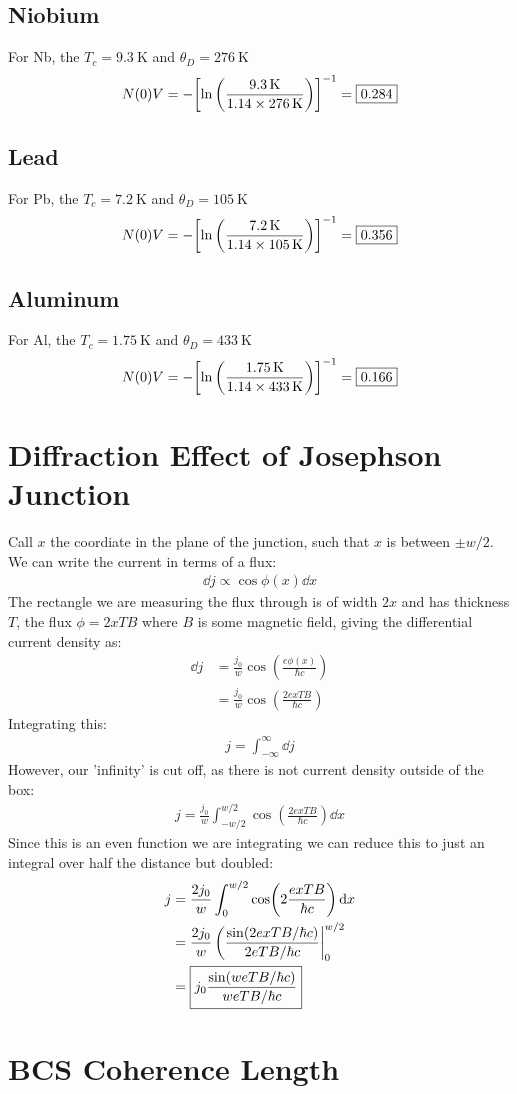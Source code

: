 \documentclass[12pt]{article}
\begin{document}
\subsection{Niobium}
For Nb, the $T_c=\SI{9.3}{\K}$ and $\theta_D=\SI{276}{\K}$
\begin{align*}
  N(0)V=-\qty[\ln\qty(\frac{\SI{9.3}{\K}}{1.14\times\SI{276}{\K}})]^{-1}
  =\boxed{0.284}
\end{align*}
\subsection{Lead}
For Pb, the $T_c=\SI{7.2}{\K}$ and $\theta_D=\SI{105}{\K}$
\begin{align*}
  N(0)V=-\qty[\ln\qty(\frac{\SI{7.2}{\K}}{1.14\times\SI{105}{\K}})]^{-1}
  =\boxed{0.356}
\end{align*}
\subsection{Aluminum}
For Al, the $T_c=\SI{1.75}{\K}$ and $\theta_D=\SI{433}{\K}$
\begin{align*}
  N(0)V=-\qty[\ln\qty(\frac{\SI{1.75}{\K}}{1.14\times\SI{433}{\K}})]^{-1}
  =\boxed{0.166}
\end{align*}
\newpage\section{Diffraction Effect of Josephson Junction}
Call $x$ the coordiate in the plane of the junction, such that $x$ is between $\pm w/2$. We can write the current in terms of a flux:
\begin{align*}
  \dd{j}\propto\cos\phi(x)\dd{x}
\end{align*}
The rectangle we are measuring the flux through is of width $2x$ and has thickness $T$, the flux $\phi=2xT B$ where $B$ is some magnetic field, giving the differential current density as:
\begin{align*}
  \dd{j}&=\frac{j_0}{w}\cos(\frac{e\phi(x)}{\hbar c})\\
  &=\frac{j_0}{w}\cos(\frac{2exTB}{\hbar c})
\end{align*}
Integrating this:
\begin{align*}
  j=\int_{-\infty}^\infty\dd{j}
\end{align*}
However, our 'infinity' is cut off, as there is not current density outside of the box:
\begin{align*}
  j=\frac{j_0}{w}\int_{-w/2}^{w/2}\cos(\frac{2exTB}{\hbar c})\dd{x}
\end{align*}
Since this is an even function we are integrating we can reduce this to just an integral over half the distance but doubled:
\begin{align*}
  j&=\frac{2j_0}{w}\int_{0}^{w/2}\cos(2\frac{exTB}{\hbar c})\dd{x}\\
  &=\frac{2j_0}{w}\eval(\frac{\sin(2exTB/\hbar c)}{2eTB/\hbar c}|_0^{w/2}\\
  &=\boxed{j_0\frac{\sin(weTB/\hbar c)}{weTB/\hbar c}}
\end{align*}
\newpage\section{BCS Coherence Length}
\end{document}
